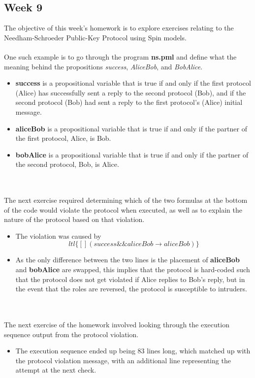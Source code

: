 \documentclass{article}
\theoremstyle{theorem}
\theoremstyle{definition}
\theoremstyle{remark}
\begin{document}
\subsection{Week 9}
The objective of this week's homework is to explore exercises relating to the Needham-Schroeder Public-Key Protocol using Spin models.
\\
\\ One such example is to go through the program \textbf{ns.pml} and define what the meaning behind the propositions \textit{success}, \textit{AliceBob}, and \textit{BobAlice}.
\begin{itemize}
\item \textbf{success} is a propositional variable that is true if and only if the first protocol (Alice) has successfully sent a reply to the second protocol (Bob), and if the second protocol (Bob) had sent a reply to the first protocol's (Alice) initial message.
\item \textbf{aliceBob} is a propositional variable that is true if and only if the partner of the first protocol, Alice, is Bob.
\item \textbf{bobAlice} is a propositional variable that is true if and only if the partner of the second protocol, Bob, is Alice.
\end{itemize}
\\
\\ The next exercise required determining which of the two formulas at the bottom of the code would violate the protocol when executed, as well as to explain the nature of the protocol based on that violation. \\
\begin{itemize}
    \item The violation was caused by $$ltl \{[]  (success \&\& aliceBob \xrightarrow{} aliceBob)\}$$
    \item As the only difference between the two lines is the placement of \textbf{aliceBob} and \textbf{bobAlice} are swapped, this implies that the protocol is hard-coded such that the protocol does not get violated if Alice replies to Bob's reply, but in the event that the roles are reversed, the protocol is susceptible to intruders.
\end{itemize}
\\
\\ The next exercise of the homework involved looking through the execution sequence output from the protocol violation.
\begin{itemize}
    \item The execution sequence ended up being 83 lines long, which matched up with the protocol violation message, with an additional line representing the attempt at the next check.
\end{itemize}
\end{document}
